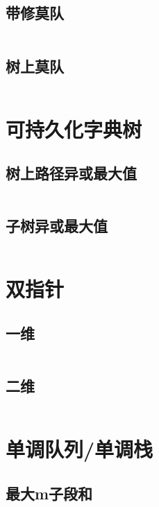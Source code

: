 \documentclass[a4paper,11pt]{article}
\begin{document}
\subsection*{带修莫队}
\inputminted[]{c++}{Template/Segment/bzoj2120.cpp}
\subsection*{树上莫队}
\inputminted[]{c++}{Template/Segment/luoguP4074.cpp}
\section*{可持久化字典树}
\subsection*{树上路径异或最大值}
\inputminted[]{c++}{Template/Segment/PersistibleTrieI.cpp}
\subsection*{子树异或最大值}
\inputminted[]{c++}{Template/Segment/PersistibleTrieII.cpp}




\newpage
\section*{双指针}
\subsection*{一维}
\inputminted[]{c++}{Template/Other/TwoPointer.cpp}
\subsection*{二维}
\inputminted[]{c++}{Template/Other/TwoDimTwoPointer.cpp}
\section*{单调队列/单调栈}
\subsection*{最大m子段和}
\inputminted[]{c++}{Template/Other/MonotonicQueueI.cpp}
\end{document}
